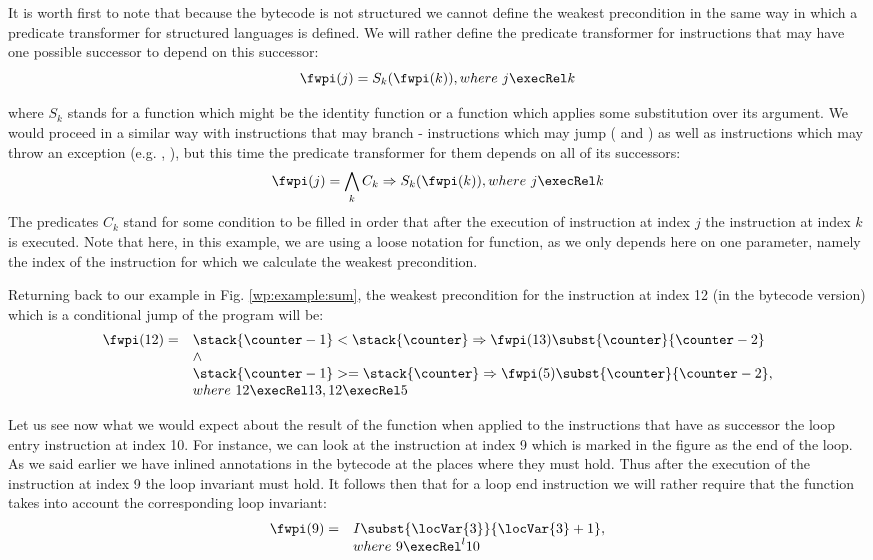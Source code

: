  It is worth first to note that because the bytecode is not structured we cannot define
 the weakest precondition in the same way in which a predicate transformer for structured
 languages is defined.  
 We will rather  define the predicate transformer for  instructions that may have one possible successor to depend on
 this successor:
$$\fwpi( j ) =  S_k(\fwpi( k )) , where  \ j \execRel k $$

where $S_k$ stands for a function which might be the identity function or a function which applies some substitution over its argument.
 We would proceed in a similar way with instructions that may branch - instructions which may jump (\goto{} and \ifCond{}) as well as instructions
 which may throw an exception (e.g. \putfield, \arrstore), but this time the predicate transformer for them depends on all of its successors:
$$\fwpi( j ) = \bigwedge_k  C_k \Rightarrow S_k(\fwpi( k )) , where  \ j \execRel k $$
The predicates $C_k$ stand for some condition to be filled in order that after the execution of instruction at index $j$ the instruction at index $k$ is executed.
Note that here, in this example, we are using a loose notation for \wpName{}  function, as we only depends here on one parameter, namely the index
of the instruction for which we calculate the weakest precondition.

Returning back to our example in Fig. \ref{wp:example:sum}, the weakest precondition for the instruction at index 12 (in the bytecode version) 
which is a conditional jump  of the program will be:
$$ \begin{array}{ll} \fwpi( 12 )  = & 
                      \stack{\counter - 1} < \stack{\counter} \Rightarrow   \fwpi(13) \subst{\counter}{\counter - 2} \\
                      &\wedge \\
		      &\stack{\counter - 1} >= \stack{\counter} \Rightarrow   \fwpi(5)\subst{\counter}{\counter - 2}, \\
		      & where \ 12 \execRel 13, 12 \execRel 5
   \end{array}
		      $$

Let us see now what  we would expect about the result of   the function \fwpi{} when applied to the instructions
that have as successor the loop entry instruction at index 10. For instance, we can look at the instruction
at index 9 which is marked in the figure as the end of the loop. 
As we said earlier we have inlined annotations in the bytecode at the places where they must hold. Thus after the execution
of the instruction at index 9  the loop invariant must hold. It follows then that for a loop end instruction 
we will rather require that the \fwpi{} function takes into account the corresponding loop invariant:
$$ \begin{array}{ll} \fwpi( 9 )  = &
                    I \subst{\locVar{3}}{\locVar{3} + 1}, \\
		     & where \ 9 \execRel^l 10 
		     \end{array}$$


